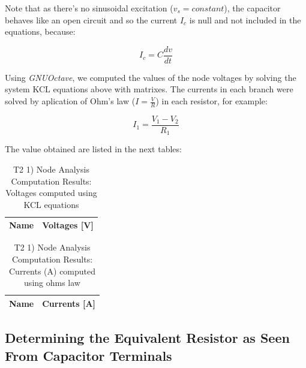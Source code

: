 Note that as there's no sinusoidal excitation ($v_s = constant$), the capacitor behaves like an open circuit and so the current $I_c$ is null and not included in the equations, because:

\begin{center}
  \begin{equation}
    I_c = C\frac{dv}{dt}
  \end{equation}
\end{center}


Using \textit{GNUOctave}, we computed the values of the node voltages by solving the system KCL equations above with matrixes. The currents in each branch were solved by aplication of Ohm's law ($I = \frac{V}{R}$) in each resistor, for example:

\begin{center}
  \begin{equation}
    I_1 = \frac{V_1 - V_2}{R_1}
  \end{equation} 
\end{center}

\newpage

The value obtained are listed in the next tables:


\begin{table}[h]
  \centering
  \begin{tabular}{|l|r|}
    \hline    
    {\bf Name} & {\bf Voltages [V]} \\ \hline
    
  \end{tabular}
  \caption{T2 1) Node Analysis Computation Results: Voltages computed using KCL equations}
  \label{tab:nodeVoltages1}
\end{table}


\begin{table}[h]
  \centering
  \begin{tabular}{|l|r|}
    \hline    
    {\bf Name} & {\bf Currents [A]} \\ \hline
    
  \end{tabular}
  \caption{T2 1) Node Analysis Computation Results: Currents (A) computed using ohms law}
  \label{tab:nodeCurrents1}
\end{table}






\subsection{Determining the Equivalent Resistor as Seen From Capacitor Terminals}

